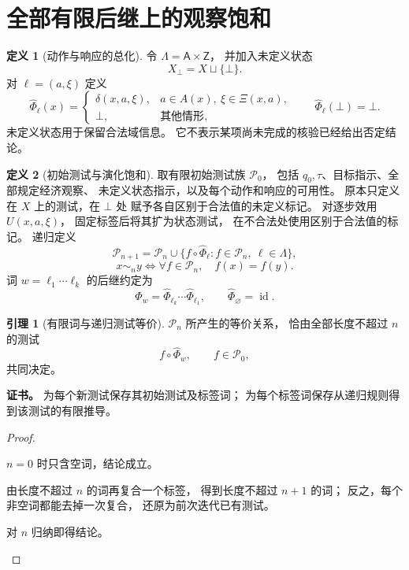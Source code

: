 \documentclass[UTF8,12pt,a4paper,openany,fontset=none,zihao=false]{ctexrep}
\theoremstyle{definition}
\newtheorem{definition}{定义}[chapter]
\newtheorem{lemma}{引理}[chapter]
\newenvironment{certificate}{\par\noindent\textbf{证书。}\ignorespaces}{\par}
\newcommand{\1}{\mathbf 1}
\begin{document}
\section{全部有限后继上的观察饱和}
\begin{definition}[动作与响应的总化]
\label{q:totalization}
令 \(\Lambda=\mathsf A\times\mathsf Z\)，
并加入未定义状态
\[
X_\bot=X\sqcup\{\bot\}.
\]
对 \(\ell=(a,\xi)\) 定义
\[
\widehat\Phi_\ell(x)=
\begin{cases}
\delta(x,a,\xi),&
a\in A(x),\ \xi\in\Xi(x,a),\\
\bot,&\text{其他情形},
\end{cases}
\qquad
\widehat\Phi_\ell(\bot)=\bot.
\]
未定义状态用于保留合法域信息。
它不表示某项尚未完成的核验已经给出否定结论。
\end{definition}
\begin{definition}[初始测试与演化饱和]
\label{q:saturation}
取有限初始测试族 \(\mathcal P_0\)，
包括 \(q_0,\tau\)、目标指示、全部规定经济观察、
未定义状态指示，以及每个动作和响应的可用性。
原本只定义在 \(X\) 上的测试，在 \(\bot\) 处
赋予各自区别于合法值的未定义标记。
对逐步效用 \(U(x,a,\xi)\)，
固定标签后将其扩为状态测试，
在不合法处使用区别于合法值的标记。
递归定义
\[
\mathcal P_{n+1}
=\mathcal P_n\cup
\{f\circ\widehat\Phi_\ell:
f\in\mathcal P_n,\ \ell\in\Lambda\},
\]
\[
x\sim_n y
\Longleftrightarrow
\forall f\in\mathcal P_n,\quad f(x)=f(y).
\]
词 \(w=\ell_1\cdots\ell_k\) 的后继约定为
\[
\widehat\Phi_w
=\widehat\Phi_{\ell_k}\cdots\widehat\Phi_{\ell_1},
\qquad
\widehat\Phi_{\varnothing}=\operatorname{id}.
\]
\end{definition}
\begin{lemma}[有限词与递归测试等价]
\label{q:word-tests}
\(\mathcal P_n\) 所产生的等价关系，
恰由全部长度不超过 \(n\) 的测试
\[
f\circ\widehat\Phi_w,\qquad f\in\mathcal P_0,
\]
共同决定。
\end{lemma}
\begin{certificate}
为每个新测试保存其初始测试及标签词；
为每个标签词保存从递归规则得到该测试的有限推导。
\end{certificate}
\begin{proof}
\begin{semanticsteps}
\item \(n=0\) 时只含空词，结论成立。
\item 由长度不超过 \(n\) 的词再复合一个标签，
得到长度不超过 \(n+1\) 的词；
反之，每个非空词都能去掉一次复合，
还原为前次迭代已有测试。
\item 对 \(n\) 归纳即得结论。
\end{semanticsteps}
\end{proof}
\end{document}
